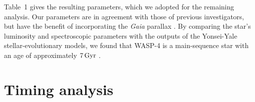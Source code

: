 \documentclass[12pt,twocolumn,tighten]{aastex62}
\begin{document}
Table~1 gives the resulting parameters, which we adopted for the
remaining analysis.   Our  parameters are in agreement
with those of previous investigators, but have the benefit of
incorporating the {\it Gaia} parallax
\citep{wilson_wasp-4b_2008,gillon_discovery_2009,winn_transit_2009,southworth_homogeneous_2011,petrucci_no_2013,huitson_gemini_2017}.
By comparing the star's luminosity and spectroscopic parameters with
the outputs of the Yonsei-Yale stellar-evolutionary models, we found
that WASP-4 is a main-sequence star with an age of approximately
$7\,{\rm Gyr}$ .


\section{Timing analysis}
\label{sec:timing}
\end{document}
